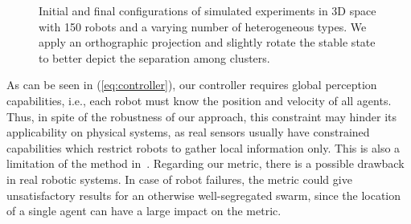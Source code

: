 \documentclass[letterpaper, 10 pt, conference]{ieeeconf}  %
\begin{document}
\begin{figure}[thpb]
\caption{Initial and final configurations of simulated experiments in
  3D space with 150 robots and a varying number of heterogeneous
  types. We apply an orthographic projection and slightly rotate the
  stable state to better depict the separation among clusters.}
\label{fig:3Dsimulations}
\end{figure}
\addtolength{\textheight}{-1.5cm}

As can be seen in (\ref{eq:controller}), our controller requires
global perception capabilities, i.e., each robot must know the
position and velocity of all agents. Thus, in spite of the robustness
of our approach, this constraint may hinder its applicability on
physical systems, as real sensors usually have constrained
capabilities which restrict robots to gather local information
only. This is also a limitation of the method
in~\cite{Kumar:10}. Regarding our metric, there is a possible drawback
in real robotic systems. In case of robot failures, the metric could
give unsatisfactory results for an otherwise well-segregated swarm,
since the location of a single agent can have a large impact on the
metric.
\end{document}
